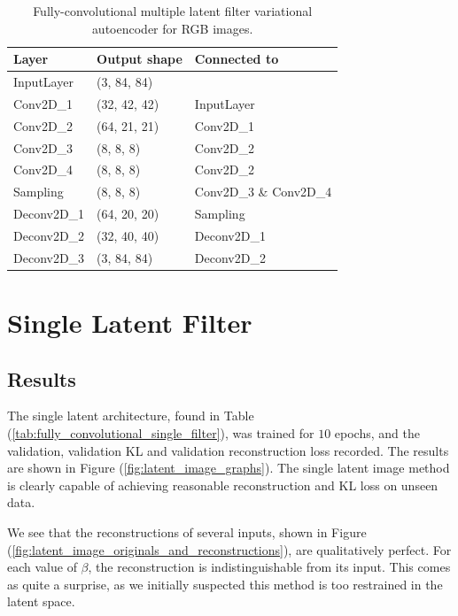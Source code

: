 \begin{table}[]
\centering
\begin{tabular}{@{}lll@{}}
\toprule
\textbf{Layer} & \textbf{Output shape} & \textbf{Connected to}  \\ \midrule
InputLayer     & (3, 84, 84)           &                        \\
Conv2D\_1      & (32, 42, 42)          & InputLayer             \\
Conv2D\_2      & (64, 21, 21)          & Conv2D\_1              \\
Conv2D\_3      & (8, 8, 8)             & Conv2D\_2              \\
Conv2D\_4      & (8, 8, 8)             & Conv2D\_2              \\
Sampling       & (8, 8, 8)             & Conv2D\_3 \& Conv2D\_4 \\
Deconv2D\_1    & (64, 20, 20)          & Sampling               \\
Deconv2D\_2    & (32, 40, 40)          & Deconv2D\_1            \\
Deconv2D\_3    & (3, 84, 84)           & Deconv2D\_2           
\end{tabular}
\caption{Fully-convolutional multiple latent filter variational autoencoder for RGB images.}
\label{tab:fully_convolutional_multiple_filter_rgb}
\end{table}


%
%
%
%
%
\section{Single Latent Filter}

\subsection{Results}
The single latent architecture, found in Table (\ref{tab:fully_convolutional_single_filter}), was trained for $10$ epochs, and the validation, validation KL and validation reconstruction loss recorded. The results are shown in Figure (\ref{fig:latent_image_graphs}). The single latent image method is clearly capable of achieving reasonable reconstruction and KL loss on unseen data.

We see that the reconstructions of several inputs, shown in Figure (\ref{fig:latent_image_originals_and_reconstructions}), are qualitatively perfect. For each value of $\beta$, the reconstruction is indistinguishable from its input. This comes as quite a surprise, as we initially suspected this method is too restrained in the latent space.

